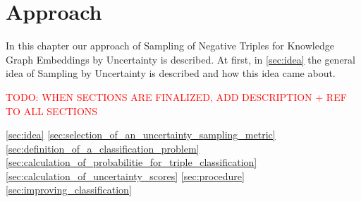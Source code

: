 \chapter{Approach}
\label{ch:approach}

In this chapter our approach of Sampling of Negative Triples for Knowledge Graph Embeddings by Uncertainty is described.
At first, in \autoref{sec:idea} the general idea of Sampling by Uncertainty is described and how this idea came about.

\textcolor{red}{TODO: WHEN SECTIONS ARE FINALIZED, ADD DESCRIPTION + REF TO ALL SECTIONS}

\autoref{sec:idea}
\autoref{sec:selection_of_an_uncertainty_sampling_metric}
\autoref{sec:definition_of_a_classification_problem}
\autoref{sec:calculation_of_probabilitie_for_triple_classification}
\autoref{sec:calculation_of_uncertainty_scores}
\autoref{sec:procedure}
\autoref{sec:improving_classification}













